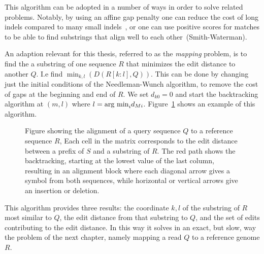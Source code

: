 This algorithm can be adopted in a number of ways in order to solve related problems.
Notably, by using an affine gap penalty one can reduce the cost of long indels compared to many small indels~\cite{affine}, or one can use positive scores for matches to be able to find substrings that align well to each other~\cite{smithwaterman}(Smith-Waterman).

An adaption relevant for this thesis, referred to as the \emph{mapping} problem, is to find the a substring of one sequence $R$ that minimizes the edit distance to another $Q$.
I.e find $\min_{k, l}(D(R[k:l], Q))$.
This can be done by changing just the initial conditions of the Needleman-Wunch algorithm, to remove the cost of gaps at the beginning and end of $R$.
We set $d_{k0} = 0$ and start the backtracking algorithm at $(m, l)$ where $l=\argmin_i d_{Mi}$.
Figure~\ref{fig:needlemanmap} shows an example of this algorithm.
\begin{figure}
  \begin{tikzpicture}
    
  \end{tikzpicture}
  \caption{
    Figure showing the alignment of a query sequence $Q$ to a reference sequence $R$, 
    Each cell in the matrix corresponds to the edit distance between a prefix of $S$ and a substring of $R$. The red path shows the backtracking, starting at the lowest value of the last column, resulting in an alignment block where each diagonal arrow gives a symbol from both sequences, while horizontal or vertical arrows give an insertion or deletion.}
  \label{fig:needlemanmap}
\end{figure}
This algorithm provides three results: the coordinate $k, l$ of the substring of $R$ most similar to $Q$, the edit distance from that substring to $Q$, and the set of edits contributing to the edit distance.
In this way it solves in an exact, but slow, way the problem of the next chapter, namely mapping a read $Q$ to a reference genome $R$.

